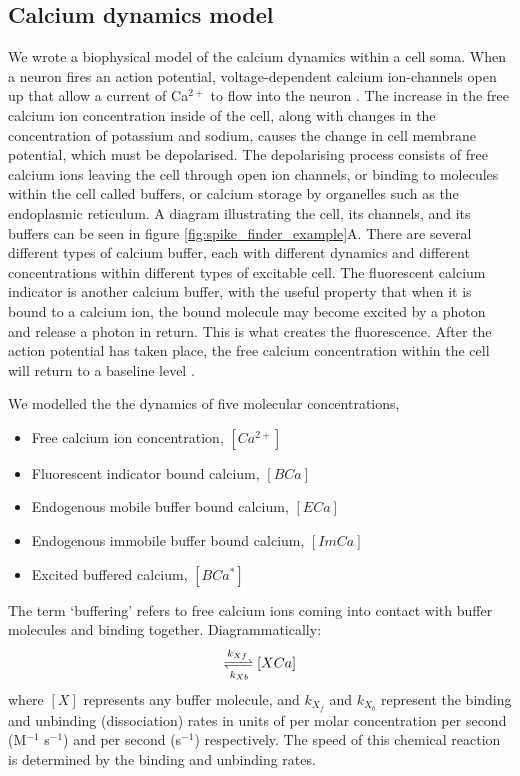 \subsection{Calcium dynamics model}
We wrote a biophysical model of the calcium dynamics within a cell soma. When a neuron fires an action potential, voltage-dependent calcium ion-channels open up that allow a current of Ca$^{2+}$ to flow into the neuron  \parencite{koch}. The increase in the free calcium ion concentration inside of the cell, along with changes in the concentration of potassium and sodium, causes the change in cell membrane potential, which must be depolarised. The depolarising process consists of free calcium ions leaving the cell through open ion channels, or binding to molecules within the cell called buffers, or calcium storage by organelles such as the endoplasmic reticulum. A diagram illustrating the cell, its channels, and its buffers can be seen in figure \ref{fig:spike_finder_example}A. There are several different types of calcium buffer, each with different dynamics and different concentrations within different types of excitable cell. The fluorescent calcium indicator is another calcium buffer, with the useful property that when it is bound to a calcium ion, the bound molecule may become excited by a photon and release a photon in return. This is what creates the fluorescence. After the action potential has taken place, the free calcium concentration within the cell will return to a baseline level  \parencite{maravall}.

We modelled the the dynamics of five molecular concentrations,
\begin{itemize}
    \item Free calcium ion concentration, $[Ca^{2+}]$
    \item Fluorescent indicator bound calcium, $[BCa]$
    \item Endogenous mobile buffer bound calcium, $[ECa]$
    \item Endogenous immobile buffer bound calcium, $[ImCa]$
    \item Excited buffered calcium, $[BCa^{\ast}]$
\end{itemize}
The term ‘buffering’ refers to free calcium ions coming into contact with buffer molecules and binding together. Diagrammatically:
\begin{align*}
    [X][Ca^{2+}] \xrightleftharpoons[k_{Xb}]{k_{Xf}} [XCa]
\end{align*}
where $[X]$ represents any buffer molecule, and $k_{X_f}$ and $k_{X_b}$ represent the binding and unbinding (dissociation) rates in units of per molar concentration per second (M$^{-1}$ s$^{-1}$) and per second (s$^{-1}$) respectively. The speed of this chemical reaction is determined by the binding and unbinding rates.

